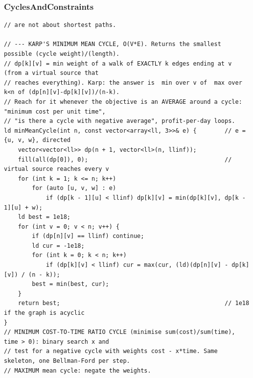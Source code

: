 \documentclass[9pt,a4paper,twocolumn]{extarticle}
\begin{document}
\filbreak
\subsubsection{CyclesAndConstraints}
\nopagebreak
\begin{lstlisting}
// are not about shortest paths.

// --- KARP'S MINIMUM MEAN CYCLE, O(V*E). Returns the smallest possible (cycle weight)/(length).
// dp[k][v] = min weight of a walk of EXACTLY k edges ending at v (from a virtual source that
// reaches everything). Karp: the answer is  min over v of  max over k<n of (dp[n][v]-dp[k][v])/(n-k).
// Reach for it whenever the objective is an AVERAGE around a cycle: "minimum cost per unit time",
// "is there a cycle with negative average", profit-per-day loops.
ld minMeanCycle(int n, const vector<array<ll, 3>>& e) {        // e = {u, v, w}, directed
    vector<vector<ll>> dp(n + 1, vector<ll>(n, llinf));
    fill(all(dp[0]), 0);                                       // virtual source reaches every v
    for (int k = 1; k <= n; k++)
        for (auto [u, v, w] : e)
            if (dp[k - 1][u] < llinf) dp[k][v] = min(dp[k][v], dp[k - 1][u] + w);
    ld best = 1e18;
    for (int v = 0; v < n; v++) {
        if (dp[n][v] == llinf) continue;
        ld cur = -1e18;
        for (int k = 0; k < n; k++)
            if (dp[k][v] < llinf) cur = max(cur, (ld)(dp[n][v] - dp[k][v]) / (n - k));
        best = min(best, cur);
    }
    return best;                                               // 1e18 if the graph is acyclic
}
// MINIMUM COST-TO-TIME RATIO CYCLE (minimise sum(cost)/sum(time), time > 0): binary search x and
// test for a negative cycle with weights cost - x*time. Same skeleton, one Bellman-Ford per step.
// MAXIMUM mean cycle: negate the weights.


\end{lstlisting}
\end{document}
